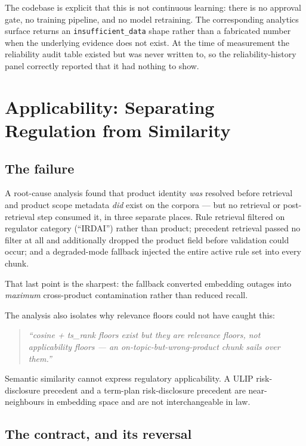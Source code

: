 \documentclass[10pt]{article}
\newcommand{\code}[1]{\texttt{\small #1}}
\begin{document}
The codebase is explicit that this is not continuous learning: there is no
approval gate, no training pipeline, and no model retraining. The corresponding
analytics surface returns an \code{insufficient\_data} shape rather than a
fabricated number when the underlying evidence does not exist. At the time of
measurement the reliability audit table existed but was never written to, so
the reliability-history panel correctly reported that it had nothing to show.

\section{Applicability: Separating Regulation from Similarity}
\label{sec:applicability}

\subsection{The failure}

A root-cause analysis found that product identity \emph{was} resolved before
retrieval and product scope metadata \emph{did} exist on the corpora --- but no
retrieval or post-retrieval step consumed it, in three separate places. Rule
retrieval filtered on regulator category (``IRDAI'') rather than product;
precedent retrieval passed no filter at all and additionally dropped the
product field before validation could occur; and a degraded-mode fallback
injected the entire active rule set into every chunk.

That last point is the sharpest: the fallback converted embedding outages into
\emph{maximum} cross-product contamination rather than reduced recall.

The analysis also isolates why relevance floors could not have caught this:
\begin{quote}\itshape
``cosine + ts\_rank floors exist but they are \emph{relevance} floors, not
\emph{applicability} floors --- an on-topic-but-wrong-product chunk sails over
them.''
\end{quote}

Semantic similarity cannot express regulatory applicability. A ULIP
risk-disclosure precedent and a term-plan risk-disclosure precedent are
near-neighbours in embedding space and are not interchangeable in law.

\subsection{The contract, and its reversal}
\end{document}

